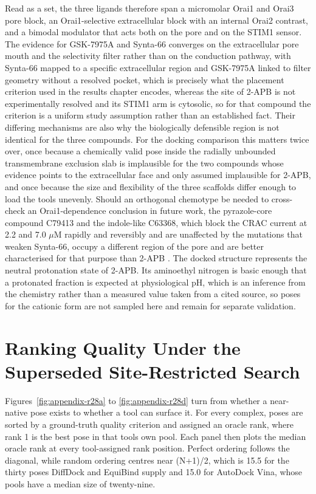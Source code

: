 Read as a set, the three ligands therefore span a micromolar Orai1 and Orai3 pore block, an Orai1-selective extracellular block with an internal Orai2 contrast, and a bimodal modulator that acts both on the pore and on the STIM1 sensor. The evidence for GSK-7975A and Synta-66 converges on the extracellular pore mouth and the selectivity filter rather than on the conduction pathway, with Synta-66 mapped to a specific extracellular region and GSK-7975A linked to filter geometry without a resolved pocket, which is precisely what the placement criterion used in the results chapter encodes, whereas the site of 2-APB is not experimentally resolved and its STIM1 arm is cytosolic, so for that compound the criterion is a uniform study assumption rather than an established fact. Their differing mechanisms are also why the biologically defensible region is not identical for the three compounds. For the docking comparison this matters twice over, once because a chemically valid pose inside the radially unbounded transmembrane exclusion slab is implausible for the two compounds whose evidence points to the extracellular face and only assumed implausible for 2-APB, and once because the size and flexibility of the three scaffolds differ enough to load the tools unevenly. Should an orthogonal chemotype be needed to cross-check an Orai1-dependence conclusion in future work, the pyrazole-core compound C79413 and the indole-like C63368, which block the CRAC current at 2.2 and 7.0 \ensuremath{\mu}M rapidly and reversibly and are unaffected by the mutations that weaken Synta-66, occupy a different region of the pore and are better characterised for that purpose than 2-APB \cite{ref042}. The docked structure represents the neutral protonation state of 2-APB. Its aminoethyl nitrogen is basic enough that a protonated fraction is expected at physiological pH, which is an inference from the chemistry rather than a measured value taken from a cited source, so poses for the cationic form are not sampled here and remain for separate validation.

\hypertarget{ranking-quality}{%
\chapter{Ranking Quality Under the Superseded Site-Restricted Search}\label{ranking-quality}}

Figures~\ref{fig:appendix-r28a} to \ref{fig:appendix-r28d} turn from whether a near-native pose exists to whether a tool can surface it. For every complex, poses are sorted by a ground-truth quality criterion and assigned an oracle rank, where rank 1 is the best pose in that tool\textquotesingle s own pool. Each panel then plots the median oracle rank at every tool-assigned rank position. Perfect ordering follows the diagonal, while random ordering centres near (N+1)/2, which is 15.5 for the thirty poses DiffDock and EquiBind supply and 15.0 for AutoDock Vina, whose pools have a median size of twenty-nine.

